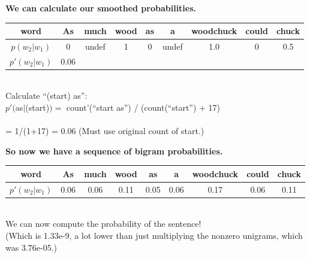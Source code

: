 \documentclass{beamer}
\newcommand{\placard}[1]{
  \begin{frame}
    \begin{center}
      \huge
      \textbf{#1}
    \end{center}
  \end{frame}
}
\newcommand{\pagestepalt}[2]{
  \begin{frame}[t]
    \begin{minipage}[t][0.26\textheight][t]{\textwidth}
      \begin{center}
        \huge
        \textbf{#1}
      \end{center}
    \end{minipage}
    
    \begin{minipage}[t][0.7\textheight][t]{\textwidth}
      #2
    \end{minipage}
  \end{frame}
}
\begin{document}
\pagestepalt{We can calculate our smoothed probabilities.}{
  \begin{tabular}{c|cccccccc}
    word & As & much & wood & as & a & woodchuck & could & chuck\\
    \hline
    $p(w_2|w_1)$ &\alert{0}&\alert{undef}&\alert{1} & \alert{0} & \alert{undef} & \alert{1.0} & \alert{0} & 0.5\\
    \alert{$p'(w_2|w_1)$} & \alert{0.06} \\
  \end{tabular}  \\

  \vspace{0.1cm}
  Calculate ``(start) as'': 
  \\$p'($as$|$(start)$) =$ count'(``start as'') / (count(``start'') + 17)\\
  \\= 1/(1+17) = 0.06
  (Must use original count of start.)\\
}


\pagestepalt{So now we have a sequence of bigram probabilities.}{
  \begin{tabular}{c|cccccccc}
    word & As & much & wood & as & a & woodchuck & could & chuck\\
    \hline
    \alert{$p'(w_2|w_1)$} & \alert{0.06} & \alert{0.06} & \alert{0.11} & \alert{0.05} & \alert{0.06} & \alert{0.17} & \alert{0.06} & \alert{0.11}\\
  \end{tabular}  \\

  We can now compute the probability of the sentence!\pause \\
  (Which is
  1.33e-9, a lot lower than just multiplying the nonzero unigrams,
  which was 3.76e-05.)  
}



\end{document}

